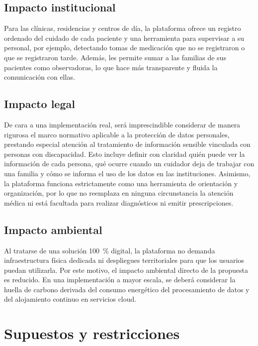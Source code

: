 \subsection{Impacto institucional}

Para las clínicas, residencias y centros de día, la plataforma ofrece un registro ordenado del cuidado de cada paciente y una herramienta para supervisar a su personal, por ejemplo, detectando tomas de medicación que no se registraron o que se registraron tarde. Además, les permite sumar a las familias de sus pacientes como observadoras, lo que hace más transparente y fluida la comunicación con ellas.

\subsection{Impacto legal}

De cara a una implementación real, será imprescindible considerar de manera rigurosa el marco normativo aplicable a la protección de datos personales, prestando especial atención al tratamiento de información sensible vinculada con personas con discapacidad. Esto incluye definir con claridad quién puede ver la información de cada persona, qué ocurre cuando un cuidador deja de trabajar con una familia y cómo se informa el uso de los datos en las instituciones. Asimismo, la plataforma funciona estrictamente como una herramienta de orientación y organización, por lo que no reemplaza en ninguna circunstancia la atención médica ni está facultada para realizar diagnósticos ni emitir prescripciones.

\subsection{Impacto ambiental}

Al tratarse de una solución 100~\% digital, la plataforma no demanda infraestructura física dedicada ni despliegues territoriales para que los usuarios puedan utilizarla. Por este motivo, el impacto ambiental directo de la propuesta es reducido. En una implementación a mayor escala, se deberá considerar la huella de carbono derivada del consumo energético del procesamiento de datos y del alojamiento continuo en servicios cloud.

\section{Supuestos y restricciones}


